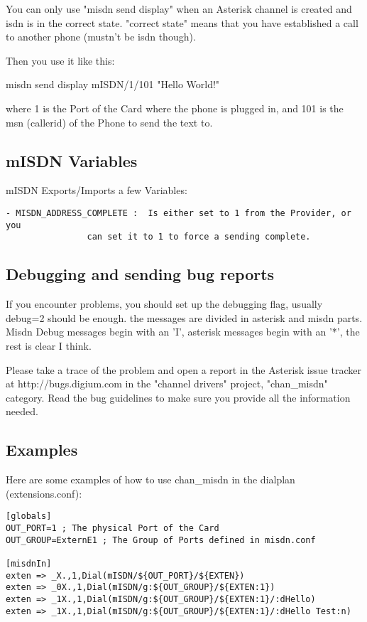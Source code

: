 You can only use "misdn send display" when an Asterisk channel is created and
isdn is in the correct state. "correct state" means that you have established a
call to another phone (mustn't be isdn though).

Then you use it like this:

misdn send display mISDN/1/101 "Hello World!"

where 1 is the Port of the Card where the phone is plugged in, and 101 is the
msn (callerid) of the Phone to send the text to.

\subsection{mISDN Variables}

mISDN Exports/Imports a few Variables: 

\begin{verbatim}
- MISDN_ADDRESS_COMPLETE : 	Is either set to 1 from the Provider, or you 
				can set it to 1 to force a sending complete.
\end{verbatim}


\subsection{Debugging and sending bug reports}

If you encounter problems, you should set up the debugging flag, usually
debug=2 should be enough. the messages are divided in asterisk and misdn
parts.  Misdn Debug messages begin with an 'I', asterisk messages begin with
an '*', the rest is clear I think.

Please take a trace of the problem and open a report in the Asterisk issue
tracker at http://bugs.digium.com in the "channel drivers" project,
"chan\_misdn" category. Read the bug guidelines to make sure you
provide all the information needed.


\subsection{Examples}

Here are some examples of how to use chan\_misdn in the dialplan
(extensions.conf):

\begin{verbatim}
[globals]
OUT_PORT=1 ; The physical Port of the Card
OUT_GROUP=ExternE1 ; The Group of Ports defined in misdn.conf

[misdnIn]
exten => _X.,1,Dial(mISDN/${OUT_PORT}/${EXTEN})
exten => _0X.,1,Dial(mISDN/g:${OUT_GROUP}/${EXTEN:1})
exten => _1X.,1,Dial(mISDN/g:${OUT_GROUP}/${EXTEN:1}/:dHello)
exten => _1X.,1,Dial(mISDN/g:${OUT_GROUP}/${EXTEN:1}/:dHello Test:n)
\end{verbatim}

